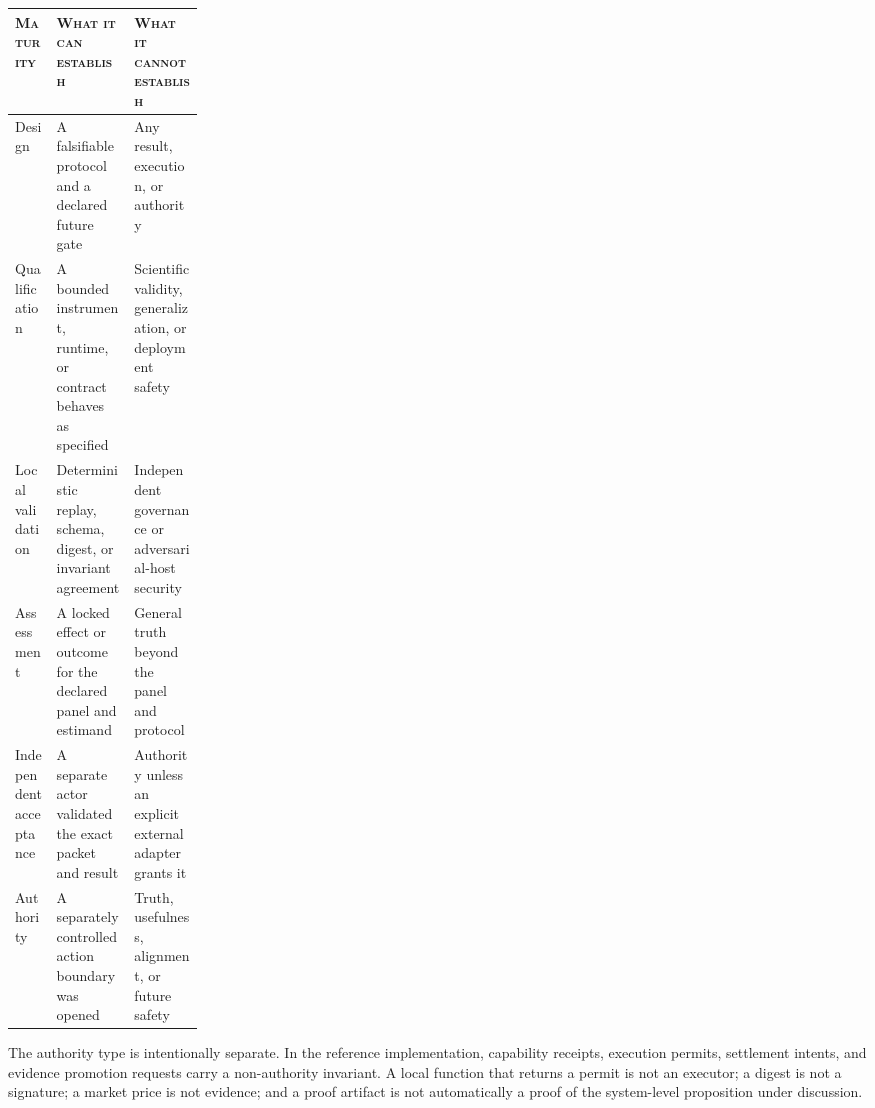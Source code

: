\documentclass[11pt,twoside]{article}
\begin{document}
\begin{center}
\begin{tabularx}{\linewidth}{@{}P{0.22\linewidth}Y Y@{}}
\toprule
\textsc{Maturity} & \textsc{What it can establish} & \textsc{What it cannot establish} \\
\midrule
Design & A falsifiable protocol and a declared future gate & Any result, execution, or authority \\
Qualification & A bounded instrument, runtime, or contract behaves as specified & Scientific validity, generalization, or deployment safety \\
Local validation & Deterministic replay, schema, digest, or invariant agreement & Independent governance or adversarial-host security \\
Assessment & A locked effect or outcome for the declared panel and estimand & General truth beyond the panel and protocol \\
Independent acceptance & A separate actor validated the exact packet and result & Authority unless an explicit external adapter grants it \\
Authority & A separately controlled action boundary was opened & Truth, usefulness, alignment, or future safety \\
\bottomrule
\end{tabularx}
\end{center}

  The authority type is intentionally separate. In the reference implementation, capability receipts, execution permits, settlement intents, and evidence promotion requests carry a non-authority invariant. A local function that returns a permit is not an executor; a digest is not a signature; a market price is not evidence; and a proof artifact is not automatically a proof of the system-level proposition under discussion.
\end{document}
